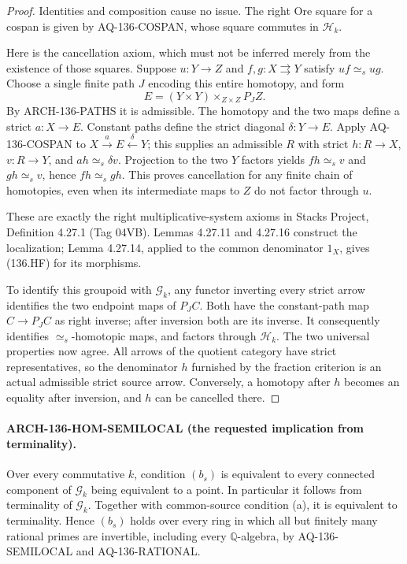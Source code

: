 \begin{proof}
Identities and composition cause no issue.  The right Ore square
for a cospan is given by AQ-136-COSPAN, whose square commutes in
$\mathcal H_k$.

Here is the cancellation axiom, which must not be inferred merely
from the existence of those squares.  Suppose $u:Y\to Z$ and
$f,g:X\rightrightarrows Y$ satisfy $uf\simeq_s ug$.  Choose a single
finite path $J$ encoding this entire homotopy, and form
\[
 E=(Y\times Y)\mathbin{\times}_{Z\times Z}P_JZ.
\]
By ARCH-136-PATHS it is admissible.  The homotopy and the two maps
define a strict $a:X\to E$.  Constant paths define the strict
diagonal $\delta:Y\to E$.  Apply AQ-136-COSPAN to
$X\xrightarrow a E\xleftarrow\delta Y$; this supplies an admissible
$R$ with strict $h:R\to X$, $v:R\to Y$, and $ah\simeq_s\delta v$.
Projection to the two $Y$ factors yields
$fh\simeq_s v$ and $gh\simeq_s v$, hence $fh\simeq_s gh$.
This proves cancellation for any finite chain of homotopies, even
when its intermediate maps to $Z$ do not factor through $u$.

These are exactly the right multiplicative-system axioms in
Stacks Project, Definition 4.27.1 (Tag 04VB).  Lemmas 4.27.11 and
4.27.16 construct the localization; Lemma 4.27.14, applied to the
common denominator $1_X$, gives (136.HF) for its morphisms.

To identify this groupoid with $\mathcal G_k$, any functor inverting
every strict arrow identifies the two endpoint maps of $P_JC$.
Both have the constant-path map $C\to P_JC$ as right inverse;
after inversion both are its inverse.  It consequently identifies
$\simeq_s$-homotopic maps, and factors through $\mathcal H_k$.
The two universal properties now agree.  All arrows of the
quotient category have strict representatives, so the denominator
$h$ furnished by the fraction criterion is an actual admissible
strict source arrow.  Conversely, a homotopy after $h$ becomes
an equality after inversion, and $h$ can be cancelled there.
\end{proof}

\paragraph{ARCH-136-HOM-SEMILOCAL (the requested implication from terminality).}
Over every commutative $k$, condition $(b_s)$ is equivalent to every
connected component of $\mathcal G_k$ being equivalent to a point.
In particular it follows from terminality of $\mathcal G_k$.
Together with common-source condition (a), it is equivalent to
terminality.  Hence $(b_s)$ holds over every ring in which all but
finitely many rational primes are invertible, including every
$\mathbb Q$-algebra, by AQ-136-SEMILOCAL and AQ-136-RATIONAL.

